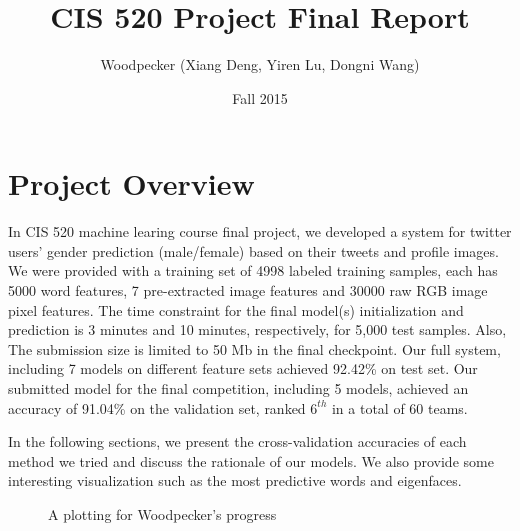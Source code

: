 \documentclass[english]{article}
\title{CIS 520 Project Final Report}
\author{Woodpecker (Xiang Deng, Yiren Lu, Dongni Wang)}
\date{Fall 2015}
\begin{document}
\maketitle
\section{Project Overview}
\indent \indent In CIS 520 machine learing course final project, we developed a system for twitter users'  gender prediction (male/female) based on their tweets and profile images. We were provided with a training set of 4998 labeled training samples, each has 5000 word features, 7 pre-extracted image features and 30000 raw RGB image pixel features. The time constraint for the final model(s) initialization and prediction is 3 minutes and 10 minutes, respectively, for 5,000 test samples. Also, The submission size is limited to 50 Mb in the final checkpoint. Our full system, including 7 models on different feature sets achieved 92.42\% on test set. Our submitted model for the final competition, including 5 models, achieved an accuracy of  91.04\% on the validation set, ranked $6^{th}$ in a total of 60 teams. \par
\par
In the following sections, we present the cross-validation accuracies of each method we tried and discuss the rationale of our models. We also provide some interesting visualization such as the most predictive words and eigenfaces. 


\begin{figure}[h!]
\begin{center}
\caption{A plotting for Woodpecker's progress}
\label{ProcessPlot}
\end{center}
\end{figure}






\end{document}
